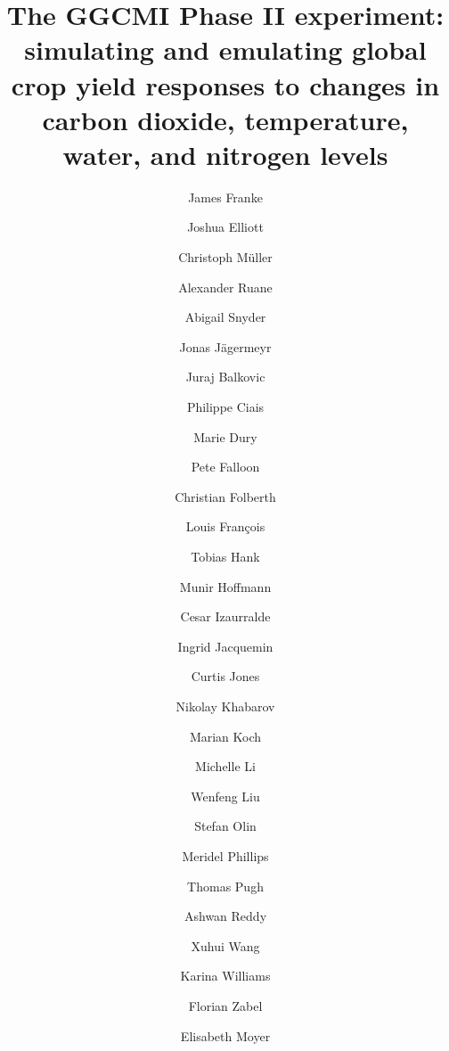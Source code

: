 \documentclass[preprint, 5p, times, twocolumn]{elsarticle}
\begin{document}
\begin{frontmatter}

\title{The GGCMI Phase II experiment: simulating and emulating global crop yield responses to changes in carbon dioxide, temperature, water, and nitrogen levels}

\author[1,2]{James Franke}
\author[2,3]{Joshua Elliott}
\author[4]{Christoph M\"{u}ller}
\author[5]{Alexander Ruane}
\author[6]{Abigail Snyder}
\author[3,2,4,5]{Jonas J\"{a}germeyr}
\author[7,8]{Juraj Balkovic}
\author[9,10]{Philippe Ciais}
\author[11]{Marie Dury}
\author[12]{Pete Falloon}
\author[7]{Christian Folberth}
\author[11]{Louis Fran{\c{c}}ois}
\author[13]{Tobias Hank}
\author[14]{Munir Hoffmann}
\author[15,16]{Cesar Izaurralde}
\author[11]{Ingrid Jacquemin}
\author[15]{Curtis Jones}
\author[7]{Nikolay Khabarov}
\author[14]{Marian Koch}
\author[2, 17]{Michelle Li}
\author[18,9]{Wenfeng Liu}
\author[19]{Stefan Olin}
\author[5,20]{Meridel Phillips}
\author[21,22]{Thomas Pugh}
\author[15]{Ashwan Reddy}
\author[9,10]{Xuhui Wang}
\author[12]{Karina Williams}
\author[13]{Florian Zabel}
\author[1,2]{Elisabeth Moyer}
\address[1]{Department of the Geophysical Sciences, University of Chicago, Chicago, IL, USA}
\address[2]{Center for Robust Decision-making on Climate and Energy Policy (RDCEP), University of Chicago, Chicago, IL, USA}
\address[3]{Department of Computer Science, University of Chicago, Chicago, IL, USA}
\address[4]{Potsdam Institute for Climate Impact Research, Leibniz Association (Member), Potsdam, Germany}
\address[5]{NASA Goddard Institute for Space Studies, New York, NY, United States}
\address[6]{Joint Global Change Research Institute, Pacific Northwest National Laboratory, College Park, MD, USA}
\address[7]{Ecosystem Services and Management Program, International Institute for Applied Systems Analysis, Laxenburg, Austria}
\address[8]{Department of Soil Science, Faculty of Natural Sciences, Comenius University in Bratislava, Bratislava, Slovak Republic}
\address[9]{Laboratoire des Sciences du Climat et de l'Environnement,
CEA-CNRS-UVSQ, 91191 Gif-sur-Yvette, France}
\address[10]{Sino-French Institute of Earth System Sciences, College of Urban and
Environmental Sciences, Peking University, Beijing, China}
\address[11]{Unit{\'{e}} de Mod{\'{e}}lisation du Climat et des Cycles Biog\'eochimiques, UR SPHERES, Institut d'Astrophysique et de G\'eophysique, University of Li\`ege, Belgium}
\address[12]{Met Office Hadley Centre, Exeter, United Kingdom}
\address[13]{Department of Geography, Ludwig-Maximilians-Universit\"{a}t, Munich, Germany}

\end{frontmatter}
\end{document}
